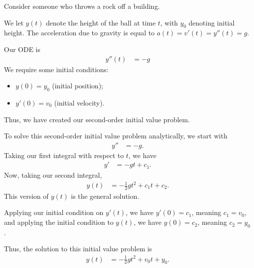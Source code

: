 \documentclass[10pt]{mypackage}
\begin{document}
  \begin{example}
    Consider someone who throws a rock off a building.\newline

    We let $y(t)$ denote the height of the ball at time $t$, with $y_0$ denoting initial height. The acceleration due to gravity is equal to $a(t) = v'(t) = y''(t) = g$.\newline

    Our ODE is
    \begin{align*}
      y''(t) &= -g \tag*{for $0 \leq t \leq T$.}
    \end{align*}
    We require some initial conditions:
    \begin{itemize}
      \item $y(0) = y_0$ (initial position);
      \item $y'(0) = v_0$ (initial velocity).
    \end{itemize}
    Thus, we have created our second-order initial value problem.\newline

    To solve this second-order initial value problem analytically, we start with
    \begin{align*}
      y'' &= -g.
    \end{align*}
    Taking our first integral with respect to $t$, we have
    \begin{align*}
      y' &= -gt + c_1.
    \end{align*}
    Now, taking our second integral, 
    \begin{align*}
      y(t) &= -\frac{1}{2}gt^2 + c_1 t + c_2.
    \end{align*}
    This version of $y(t)$ is the general solution.\newline

    Applying our initial condition on $y'(t)$, we have $y'(0) = c_1$, meaning $c_1 = v_0$, and applying the initial condition to $y(t)$, we have $y(0) = c_2$, meaning $c_2 = y_0$.\newline

    Thus, the solution to this initial value problem is
    \begin{align*}
      y(t) &= -\frac{1}{2}gt^2 + v_0 t + y_0.
    \end{align*}
  \end{example}
\end{document}
